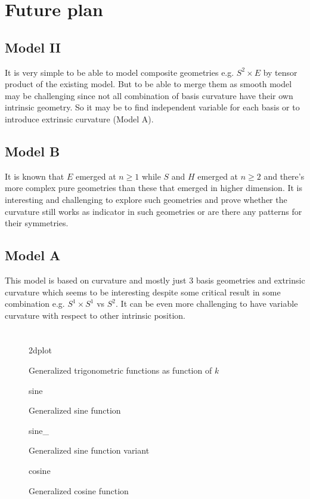 \documentclass[stu, babel, american, biblatex, a4paper, leqno, draftall]{apa7}
\newcommand{\insertstandalone}[2]{{#2}}
\newcommand{\insertstandalone}[2]{\texttt{[image: \#1/\#2.pdf]}}
\begin{document}
\section{Future plan}
\subsection{Model II}
It is very simple to be able to model composite geometries e.g. $S^2 \times E$ by tensor product of the existing model. But to be able to merge them as smooth model may be challenging since not all combination of basis curvature have their own intrinsic geometry. So it may be to find independent variable for each basis or to introduce extrinsic curvature (Model A).
\subsection{Model B}
It is known that $E$ emerged at $n\ge1$ while $S$ and $H$ emerged at $n\ge2$ and there's more complex pure geometries than these that emerged in higher dimension. It is interesting and challenging to explore such geometries and prove whether the curvature still works as indicator in such geometries or are there any patterns for their symmetries.
\subsection{Model A}
This model is based on curvature and mostly just 3 basis geometries and extrinsic curvature which seems to be interesting despite some critical result in some combination e.g. $S^1 \times S^1$ vs $S^2$. It can be even more challenging to have variable curvature with respect to other intrinsic position.
\section*{}
\printbibliography
\begin{figure}
    \centering
    \insertstandalone{figures}{2dplot}
    \caption{Generalized trigonometric functions as function of $k$}\label{TrigonometryPlotted}
\end{figure}
\begin{figure}
    \centering
    \insertstandalone{figures}{sine}
    \caption{Generalized sine function}\label{TrigonometrySinePlotted}
\end{figure}
\begin{figure}
    \centering
    \insertstandalone{figures}{sine_}
    \caption{Generalized sine function variant}\label{TrigonometrySineVarPlotted}
\end{figure}
\begin{figure}
    \centering
    \insertstandalone{figures}{cosine}
    \caption{Generalized cosine function}\label{TrigonometryCosinePlotted}
\end{figure}
\end{document}
